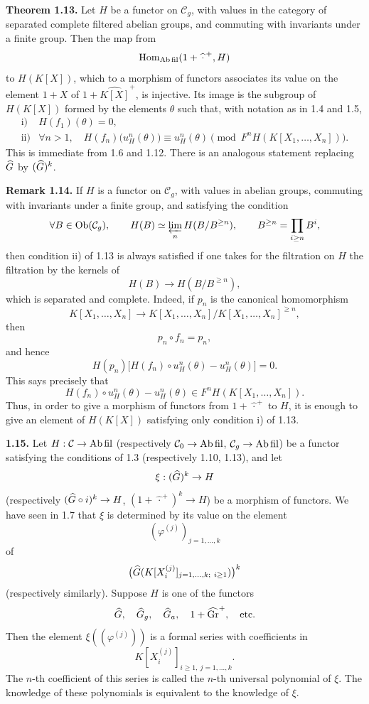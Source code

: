 \documentclass[11pt]{article}
\begin{document}
\textbf{Theorem 1.13.} Let \(H\) be a functor on \(\mathcal C_g\), with values in the category of separated complete filtered abelian groups, and commuting with invariants under a finite group. Then the map from
\[
  \operatorname{Hom}_{\mathrm{Ab\,fil}}(1+\widehat{\,\cdot\,}^{+},H)
\]
to \(H(K[X])\), which to a morphism of functors associates its value on the element \(1+X\) of \(1+\widehat{K[X]}^{+}\), is injective. Its image is the subgroup of \(H(K[X])\) formed by the elements \(\theta\) such that, with notation as in 1.4 and 1.5,
\[
\begin{array}{ll}
\text{i)}&H(f_1)(\theta)=0,\\[0.3em]
\text{ii)}&\forall n>1,\quad
H(f_n)\bigl(u_H^n(\theta)\bigr)\equiv u_H^n(\theta)
 \pmod{F^nH(K[X_1,\ldots,X_n])}.
\end{array}
\]
This is immediate from 1.6 and 1.12. There is an analogous statement replacing \(\widehat G\) by \((\widehat G)^k\).

\textbf{Remark 1.14.} If \(H\) is a functor on \(\mathcal C_g\), with values in abelian groups, commuting with invariants under a finite group, and satisfying the condition
\[
  \forall B\in\operatorname{Ob}(\mathcal C_g),\qquad
  H(B)\simeq \varprojlim_n H(B/B^{\geq n}),
  \qquad B^{\geq n}=\prod_{i\geq n}B^i,
\]
then condition ii) of 1.13 is always satisfied if one takes for the filtration on \(H\) the filtration by the kernels of
\[
  H(B)\longrightarrow H(B/B^{\geq n}),
\]
which is separated and complete. Indeed, if \(p_n\) is the canonical homomorphism
\[
  K[X_1,\ldots,X_n]\longrightarrow K[X_1,\ldots,X_n]/K[X_1,\ldots,X_n]^{\geq n},
\]
then
\[
  p_n\circ f_n=p_n,
\]
and hence
\[
  H(p_n)\bigl[H(f_n)\circ u_H^n(\theta)-u_H^n(\theta)\bigr]=0.
\]
This says precisely that
\[
  H(f_n)\circ u_H^n(\theta)-u_H^n(\theta)
  \in F^nH(K[X_1,\ldots,X_n]).
\]
Thus, in order to give a morphism of functors from \(1+\widehat{\,\cdot\,}^{+}\) to \(H\), it is enough to give an element of \(H(K[X])\) satisfying only condition i) of 1.13.

\textbf{1.15.} Let \(H:\mathcal C\to\mathrm{Ab\,fil}\) (respectively \(\mathcal C_0\to\mathrm{Ab\,fil}\), \(\mathcal C_g\to\mathrm{Ab\,fil}\)) be a functor satisfying the conditions of 1.3 (respectively 1.10, 1.13), and let
\[
  \xi:(\widehat G)^k\to H
\]
(respectively \((\widehat G\circ i)^k\to H\), \((1+\widehat{\,\cdot\,}^{+})^k\to H\)) be a morphism of functors. We have seen in 1.7 that \(\xi\) is determined by its value on the element
\[
  (\varphi^{(j)})_{j=1,\ldots,k}
\]
of
\[
  \bigl(\Ghat(K[X_i^{(j)}]_{j=1,\ldots,k;\ i\geq 1})\bigr)^k
\]
(respectively similarly). Suppose \(H\) is one of the functors
\[
  \widehat G,\quad \widehat G_g,\quad \widehat G_a,\quad 1+\widehat{\operatorname{Gr}}^{+},\quad\text{etc.}
\]
Then the element \(\xi((\varphi^{(j)}))\) is a formal series with coefficients in
\[
  K[X_i^{(j)}]_{i\geq 1,\ j=1,\ldots,k}.
\]
The \(n\)-th coefficient of this series is called the \(n\)-th universal polynomial of \(\xi\). The knowledge of these polynomials is equivalent to the knowledge of \(\xi\).
\end{document}
